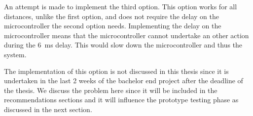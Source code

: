 An attempt is made to implement the third option.
This option works for all distances, unlike the first option, and does not require the delay on the microcontroller the second option needs.
Implementing the delay on the microcontroller means that the microcontroller cannot undertake an other action during the \SI{6}{\milli\second} delay.
This would slow down the microcontroller and thus the system.

The implementation of this option is not discussed in this thesis since it is undertaken in the last 2 weeks of the bachelor end project after the deadline of the thesis.
We discuss the problem here since it will be included in the recommendations sections and it will influence the prototype testing phase as discussed in the next section.

